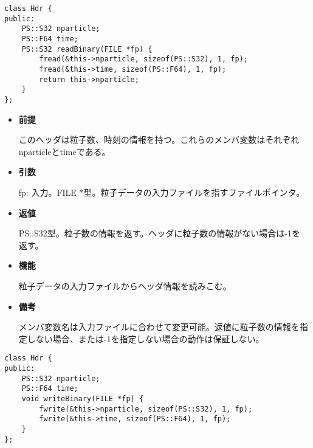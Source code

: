 
\begin{screen}
\begin{verbatim}
class Hdr {
public:
    PS::S32 nparticle;
    PS::F64 time;
    PS::S32 readBinary(FILE *fp) {
        fread(&this->nparticle, sizeof(PS::S32), 1, fp);
        fread(&this->time, sizeof(PS::F64), 1, fp);
        return this->nparticle;
    }
};
\end{verbatim}
\end{screen}

\begin{itemize}

\item {\bf 前提}

  このヘッダは粒子数、時刻の情報を持つ。これらのメンバ変数はそれぞれ
  nparticleとtimeである。

\item {\bf 引数}

  fp: 入力。FILE *型。粒子データの入力ファイルを指すファイルポインタ。
  
\item {\bf 返値}

  PS::S32型。粒子数の情報を返す。ヘッダに粒子数の情報がない場合は-1を
  返す。
  
\item {\bf 機能}

  粒子データの入力ファイルからヘッダ情報を読みこむ。
  
\item {\bf 備考}

  メンバ変数名は入力ファイルに合わせて変更可能。返値に粒子数の情報を指
  定しない場合、または-1を指定しない場合の動作は保証しない。
  
\end{itemize}


\begin{screen}
\begin{verbatim}
class Hdr {
public:
    PS::S32 nparticle;
    PS::F64 time;
    void writeBinary(FILE *fp) {
        fwrite(&this->nparticle, sizeof(PS::S32), 1, fp);
        fwrite(&this->time, sizeof(PS::F64), 1, fp);
    }
};
\end{verbatim}
\end{screen}

